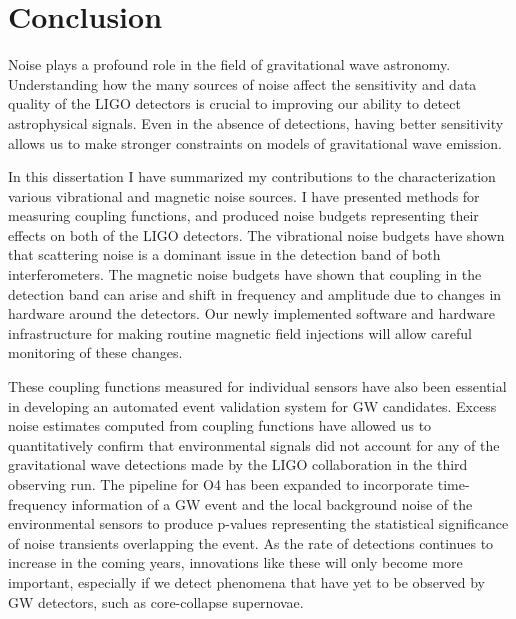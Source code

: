 \chapter{Conclusion}\label{ch:conclusion}

Noise plays a profound role in the field of gravitational wave astronomy.
Understanding how the many sources of noise affect the sensitivity and data quality of the LIGO detectors is crucial to improving our ability to detect astrophysical signals.
Even in the absence of detections, having better sensitivity allows us to make stronger constraints on models of gravitational wave emission.

In this dissertation I have summarized my contributions to the characterization various vibrational and magnetic noise sources.
I have presented methods for measuring coupling functions, and produced noise budgets representing their effects on both of the LIGO detectors.
The vibrational noise budgets have shown that scattering noise is a dominant issue in the detection band of both interferometers.
The magnetic noise budgets have shown that coupling in the detection band can arise and shift in frequency and amplitude due to changes in hardware around the detectors.
Our newly implemented software and hardware infrastructure for making routine magnetic field injections will allow careful monitoring of these changes.

These coupling functions measured for individual sensors have also been essential in developing an automated event validation system for GW candidates.
Excess noise estimates computed from coupling functions have allowed us to quantitatively confirm that environmental signals did not account for any of the gravitational wave detections made by the LIGO collaboration in the third observing run.
The pipeline for O4 has been expanded to incorporate time-frequency information of a GW event and the local background noise of the environmental sensors to produce p-values representing the statistical significance of noise transients overlapping the event.
As the rate of detections continues to increase in the coming years, innovations like these will only become more important, especially if we detect phenomena that have yet to be observed by GW detectors, such as core-collapse supernovae.
